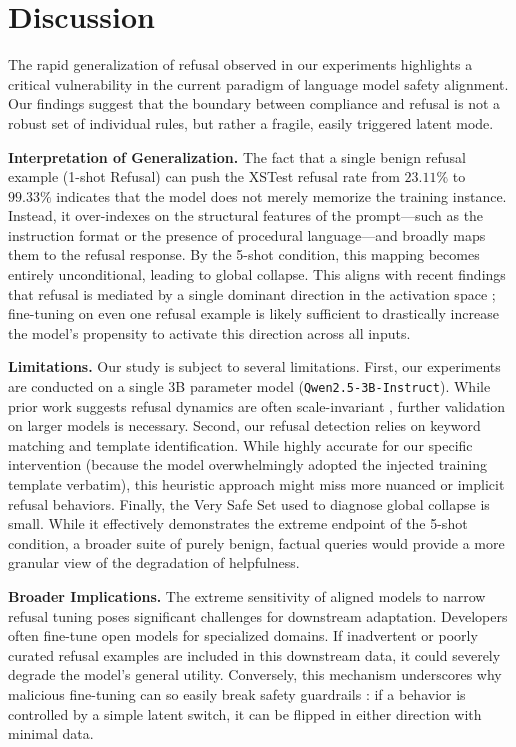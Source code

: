 \section{Discussion}
\label{sec:discussion}

The rapid generalization of refusal observed in our experiments highlights a critical vulnerability in the current paradigm of language model safety alignment. Our findings suggest that the boundary between compliance and refusal is not a robust set of individual rules, but rather a fragile, easily triggered latent mode.

{\bf Interpretation of Generalization.} The fact that a single benign refusal example (1-shot Refusal) can push the XSTest refusal rate from $23.11\%$ to $99.33\%$ indicates that the model does not merely memorize the training instance. Instead, it over-indexes on the structural features of the prompt---such as the instruction format or the presence of procedural language---and broadly maps them to the refusal response. By the 5-shot condition, this mapping becomes entirely unconditional, leading to global collapse. This aligns with recent findings that refusal is mediated by a single dominant direction in the activation space \cite{arditi2024refusal}; fine-tuning on even one refusal example is likely sufficient to drastically increase the model's propensity to activate this direction across all inputs.

{\bf Limitations.} Our study is subject to several limitations. First, our experiments are conducted on a single 3B parameter model (\texttt{Qwen2.5-3B-Instruct}). While prior work suggests refusal dynamics are often scale-invariant \cite{arditi2024refusal}, further validation on larger models is necessary. Second, our refusal detection relies on keyword matching and template identification. While highly accurate for our specific intervention (because the model overwhelmingly adopted the injected training template verbatim), this heuristic approach might miss more nuanced or implicit refusal behaviors. Finally, the Very Safe Set used to diagnose global collapse is small. While it effectively demonstrates the extreme endpoint of the 5-shot condition, a broader suite of purely benign, factual queries would provide a more granular view of the degradation of helpfulness.

{\bf Broader Implications.} The extreme sensitivity of aligned models to narrow refusal tuning poses significant challenges for downstream adaptation. Developers often fine-tune open models for specialized domains. If inadvertent or poorly curated refusal examples are included in this downstream data, it could severely degrade the model's general utility. Conversely, this mechanism underscores why malicious fine-tuning can so easily break safety guardrails \cite{qi2023finetuning}: if a behavior is controlled by a simple latent switch, it can be flipped in either direction with minimal data.